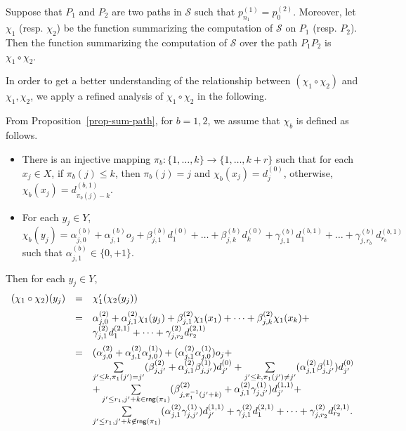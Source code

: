\documentclass[runningheads,a4paper]{llncs}
\def\Ss{{\mathcal{S} }}
\newcommand\rng{\mathsf{rng}}
\begin{document}
\begin{corollary}\label{cor-comp-two-paths}
Suppose that $P_1$ and $P_2$ are two paths in $\Ss$ such that $p^{(1)}_{n_1}=p^{(2)}_0$. Moreover, let $\chi_1$ (resp. $\chi_2$) be the function summarizing the computation of $\Ss$ on $P_1$ (resp. $P_2$). Then the function summarizing the computation of $\Ss$ over the path $P_1 P_2$ is $\chi_1 \circ \chi_2$.
\end{corollary}

In order to get a better understanding of the relationship between $(\chi_1 \circ \chi_2)$ and $\chi_1,\chi_2$, we apply a refined analysis of $\chi_1 \circ \chi_2$ in the following. 

From Proposition~\ref{prop-sum-path}, for $b=1,2$, we assume that $\chi_b$ is defined as follows.
\begin{itemize}
\item There is an injective mapping $\pi_b: \{1,\dots,k\} \rightarrow \{1,\dots, k+r\}$ such that for each $x_j \in X$, if $\pi_b(j) \le k$, then $\pi_b(j)=j$ and $\chi_b(x_j)=d^{(0)}_{j}$, otherwise, $\chi_b(x_j)=d^{(b,1)}_{\pi_b(j)-k}$.
% 
\item For each $y_j \in Y$, $\chi_b(y_j) = \alpha^{(b)}_{j,0} + \alpha^{(b)}_{j,1} o_j + \beta^{(b)}_{j,1} d^{(0)}_1 + \dots + \beta^{(b)}_{j,k} d^{(0)}_k + \gamma^{(b)}_{j,1} d^{(b,1)}_1 +\dots + \gamma^{(b)}_{j,r_b} d^{(b,1)}_{r_b}$ such that $\alpha^{(b)}_{j,1} \in \{0,+1\}$.
\end{itemize}

Then
for each $y_j \in Y$,
\[
\begin{array}{l c l}
\medskip
(\chi_1 \circ \chi_2)(y_j) & = & \chi'_1(\chi_2(y_j))\\
%
& = &  \alpha^{(2)}_{j,0} + \alpha^{(2)}_{j,1} \chi_1(y_j) + \beta^{(2)}_{j,1} \chi_1(x_1) + \dots + \beta^{(2)}_{j,k} \chi_1(x_k) +\\
\medskip
& & \gamma^{(2)}_{j,1} d^{(2,1)}_1 +\dots + \gamma^{(2)}_{j,r_2} d^{(2,1)}_{r_2} \\
%
& =  & (\alpha^{(2)}_{j,0}+\alpha^{(2)}_{j,1} \alpha^{(1)}_{j,0})+ (\alpha^{(2)}_{j,1}\alpha^{(1)}_{j,0}) o_j + \\
%
& & \sum \limits_{j' \le k, \pi_1(j')=j'} (\beta^{(2)}_{j,j'}+\alpha^{(2)}_{j,1} \beta^{(1)}_{j,j'}) d^{(0)}_{j'} + \sum \limits_{j' \le k, \pi_1(j') \neq j'} (\alpha^{(2)}_{j,1} \beta^{(1)}_{j,j'}) d^{(0)}_{j'}  \\
%
& & + \sum \limits_{j' \le r_1, j' + k \in \rng(\pi_1)} (\beta^{(2)}_{j,\pi_1^{-1}(j'+k)}+\alpha^{(2)}_{j,1} \gamma^{(1)}_{j,j'}) d^{(1,1)}_{j'} +\\
%
& & \sum \limits_{j' \le r_1, j' + k \not \in \rng(\pi_1)} (\alpha^{(2)}_{j,1} \gamma^{(1)}_{j,j'}) d^{(1,1)}_{j'} + 
 \gamma^{(2)}_{j,1} d^{(2,1)}_1 +\dots + \gamma^{(2)}_{j,r_2} d^{(2,1)}_{r_2}.
\end{array}
\] 
\end{document}
